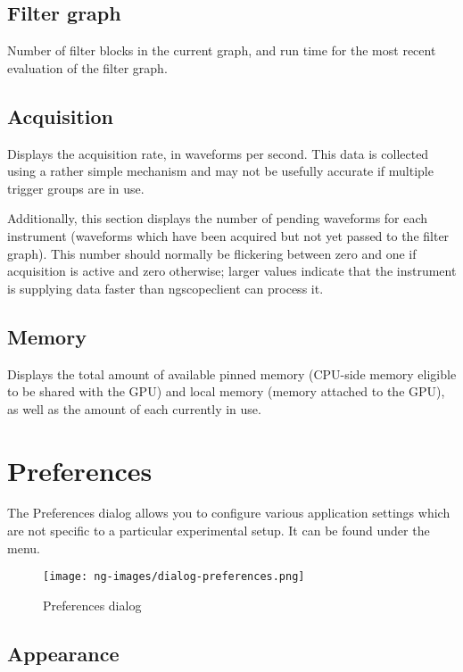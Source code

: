 \subsection{Filter graph}
Number of filter blocks in the current graph, and run time for the most recent evaluation of the
filter graph.

\subsection{Acquisition}

Displays the acquisition rate, in waveforms per second. This data is collected using a rather simple mechanism and
may not be usefully accurate if multiple trigger groups are in use.

Additionally, this section displays the number of pending waveforms for each instrument (waveforms which have been
acquired but not yet passed to the filter graph). This number should normally be flickering between zero and one if
acquisition is active and zero otherwise; larger values indicate that the instrument is supplying data faster than
ngscopeclient can process it.

\subsection{Memory}

Displays the total amount of available pinned memory (CPU-side memory eligible to be shared with the GPU) and local
memory (memory attached to the GPU), as well as the amount of each currently in use.


\section{Preferences}
\label{dlg:preferences}

The Preferences dialog allows you to configure various application settings which are not specific to a particular
experimental setup. It can be found under the  menu.

\begin{figure}[H]
\centering
\texttt{[image: ng-images/dialog-preferences.png]}
\caption{Preferences dialog}
\label{prefs}
\end{figure}

\subsection{Appearance}

